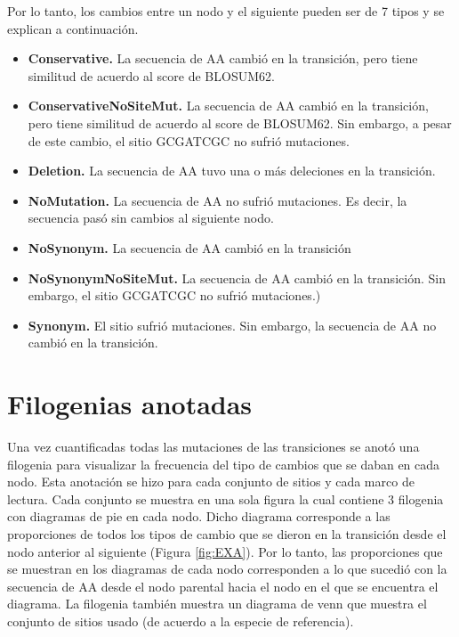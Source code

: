 \documentclass[
]{book}
\begin{document}
Por lo tanto, los cambios entre un nodo y el siguiente pueden ser de 7 tipos y se explican a continuación.

\begin{itemize}
\item
  \textbf{Conservative.} La secuencia de AA cambió en la transición, pero tiene similitud de acuerdo al score de BLOSUM62.
\item
  \textbf{ConservativeNoSiteMut.} La secuencia de AA cambió en la transición, pero tiene similitud de acuerdo al score de BLOSUM62. Sin embargo, a pesar de este cambio, el sitio GCGATCGC no sufrió mutaciones.
\item
  \textbf{Deletion.} La secuencia de AA tuvo una o más deleciones en la transición.
\item
  \textbf{NoMutation.} La secuencia de AA no sufrió mutaciones. Es decir, la secuencia pasó sin cambios al siguiente nodo.
\item
  \textbf{NoSynonym.} La secuencia de AA cambió en la transición
\item
  \textbf{NoSynonymNoSiteMut.} La secuencia de AA cambió en la transición. Sin embargo, el sitio GCGATCGC no sufrió mutaciones.)
\item
  \textbf{Synonym.} El sitio sufrió mutaciones. Sin embargo, la secuencia de AA no cambió en la transición.
\end{itemize}

\hypertarget{filogenias-anotadas}{%
\section{Filogenias anotadas}\label{filogenias-anotadas}}

Una vez cuantificadas todas las mutaciones de las transiciones se anotó una filogenia para visualizar la frecuencia del tipo de cambios que se daban en cada nodo. Esta anotación se hizo para cada conjunto de sitios y cada marco de lectura. Cada conjunto se muestra en una sola figura la cual contiene 3 filogenia con diagramas de pie en cada nodo. Dicho diagrama corresponde a las proporciones de todos los tipos de cambio que se dieron en la transición desde el nodo anterior al siguiente (Figura \ref{fig:EXA}). Por lo tanto, las proporciones que se muestran en los diagramas de cada nodo corresponden a lo que sucedió con la secuencia de AA desde el nodo parental hacia el nodo en el que se encuentra el diagrama. La filogenia también muestra un diagrama de venn que muestra el conjunto de sitios usado (de acuerdo a la especie de referencia).
\end{document}
